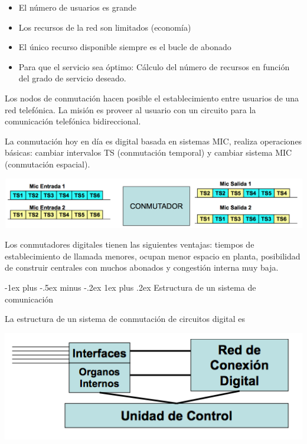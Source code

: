 \documentclass[10pt,portrait, twocolumn]{article}
\makeatletter
\renewcommand{\subsubsection}{\@startsection{subsubsection}{3}{0mm}%
                                {-1ex plus -.5ex minus -.2ex}%
                                {1ex plus .2ex}%
                                {\normalfont\small\bfseries}}
\makeatother
\begin{document}
	\begin{itemize}
		\item El número de usuarios es grande
		\item Los recursos de la red son limitados (economía)
		\item El único recurso disponible siempre es el bucle de abonado
		\item Para que el servicio sea óptimo: Cálculo del número de recursos en función del grado de servicio deseado.
	\end{itemize}
	
Los nodos de conmutación hacen posible el establecimiento entre usuarios de una red telefónica. La misión es proveer al usuario con un circuito para la comunicación telefónica bidireccional.

La conmutación hoy en día es digital basada en sistemas MIC, realiza operaciones básicas: cambiar intervalos TS (conmutación temporal) y cambiar sistema MIC (conmutación espacial).

	\begin{center}
		\includegraphics[scale = 0.3]{aaa}
	\end{center}

Los conmutadores digitales tienen las siguientes ventajas: tiempos de establecimiento de llamada menores, ocupan menor espacio en planta, posibilidad de construir centrales con muchos abonados y congestión interna muy baja.
	
\subsubsection{Estructura de un sistema de comunicación}
	
La estructura de un sistema de conmutación de circuitos digital es	
	
	\begin{center}
		\includegraphics[scale = 0.3]{estr}
	\end{center}
	
\end{document}
